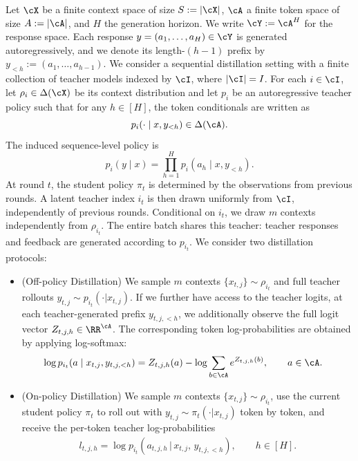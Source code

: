 \documentclass[11pt]{article}
\newcommand{\todox}[2][]{\todo[size=\scriptsize,color=yellow!20!white,#1]{Xuheng: #2}}
\begin{document}
Let $\cX$ be a finite context space of size $S:=|\cX|$, $\cA$ a finite token space of size $A:=|\cA|$, and $H$ the generation horizon. We write $\cY := \cA^H$ for the response space. Each response $y=(a_1,\ldots,a_H)\in\cY$ is generated autoregressively, and we denote its length-$(h-1)$ prefix by $y_{<h}:=(a_1,\ldots,a_{h-1})$. We consider a sequential distillation setting with a finite collection of teacher models indexed by $\cI$, where $|\cI|=I$. For each $i\in\cI$, let $\rho_i\in\Delta(\cX)$ be its context distribution and let $p_i$ be an autoregressive teacher policy such that for any $h \in [H]$, the token conditionals are written as
\[
p_i(\cdot\mid x,y_{<h})\in\Delta(\cA).
\]
The induced sequence-level policy is
\[
p_i(y\mid x)
=
\prod_{h=1}^{H}p_i(a_h\mid x,y_{<h}).
\]
At round $t$, the student policy $\pi_t$ is determined by the observations from previous rounds. A latent teacher index $i_t$ is then drawn uniformly from $\cI$, independently of previous rounds. Conditional on $i_t$, we draw $m$ contexts independently from $\rho_{i_t}$. The entire batch shares this teacher: teacher responses and feedback are generated according to $p_{i_t}$. We consider two distillation protocols:
\begin{itemize}[leftmargin=*]
    \item (Off-policy Distillation) We sample $m$ contexts $\{x_{t,j}\} \sim \rho_{i_t}$ and full teacher rollouts $y_{t,j} \sim p_{i_t}(\cdot|x_{t,j})$. If we further have access to the teacher logits, at each teacher-generated prefix $y_{t,j,<h}$, we additionally observe the full logit vector $Z_{t,j,h}\in\RR^{\cA}$. The corresponding token log-probabilities are obtained by applying log-softmax:
    \begin{align*}
        \log p_{i_t}(a\mid x_{t,j},y_{t,j,<h})
        &=Z_{t,j,h}(a)-\log\sum_{b\in\cA}e^{Z_{t,j,h}(b)}, \qquad a\in\cA.
    \end{align*}
    \item (On-policy Distillation) We sample $m$ contexts $\{x_{t,j}\} \sim \rho_{i_t}$, use the current student policy $\pi_t$ to roll out with $y_{t,j} \sim \pi_t(\cdot|x_{t,j})$ token by token, and receive the per-token teacher log-probabilities
    \begin{align*}
        l_{t,j,h} = \log p_{i_t}(a_{t,j,h}\,|\,x_{t,j},\,y_{t,j,<h}), \qquad h \in [H].
    \end{align*}
\end{itemize} 
\end{document}
